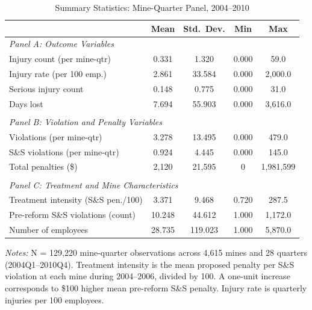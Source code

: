 \begin{table}[H]
\centering
\caption{Summary Statistics: Mine-Quarter Panel, 2004--2010}
\label{tab:summary}
\begin{threeparttable}
\footnotesize
\begin{tabular}{lcccc}
\toprule
 & Mean & Std.\ Dev. & Min & Max \\
\midrule
\multicolumn{5}{l}{\textit{Panel A: Outcome Variables}} \\[3pt]
Injury count (per mine-qtr) & 0.331 & 1.320 & 0.000 & 59.0 \\
Injury rate (per 100 emp.) & 2.861 & 33.584 & 0.000 & 2,000.0 \\
Serious injury count & 0.148 & 0.775 & 0.000 & 31.0 \\
Days lost & 7.694 & 55.903 & 0.000 & 3,616.0 \\
\\
\multicolumn{5}{l}{\textit{Panel B: Violation and Penalty Variables}} \\[3pt]
Violations (per mine-qtr) & 3.278 & 13.495 & 0.000 & 479.0 \\
S\&S violations (per mine-qtr) & 0.924 & 4.445 & 0.000 & 145.0 \\
Total penalties (\$) & 2,120 & 21,595 & 0 & 1,981,599 \\
\\
\multicolumn{5}{l}{\textit{Panel C: Treatment and Mine Characteristics}} \\[3pt]
Treatment intensity (S\&S pen./100) & 3.371 & 9.468 & 0.720 & 287.5 \\
Pre-reform S\&S violations (count) & 10.248 & 44.612 & 1.000 & 1,172.0 \\
Number of employees & 28.735 & 119.023 & 1.000 & 5,870.0 \\
\bottomrule
\end{tabular}
\begin{tablenotes}[flushleft]
\scriptsize
\item \textit{Notes:} N = 129,220 mine-quarter observations across 4,615 mines and 28 quarters (2004Q1--2010Q4). Treatment intensity is the mean proposed penalty per S\&S violation at each mine during 2004--2006, divided by 100. A one-unit increase corresponds to \$100 higher mean pre-reform S\&S penalty. Injury rate is quarterly injuries per 100 employees.
\end{tablenotes}
\end{threeparttable}
\end{table}
